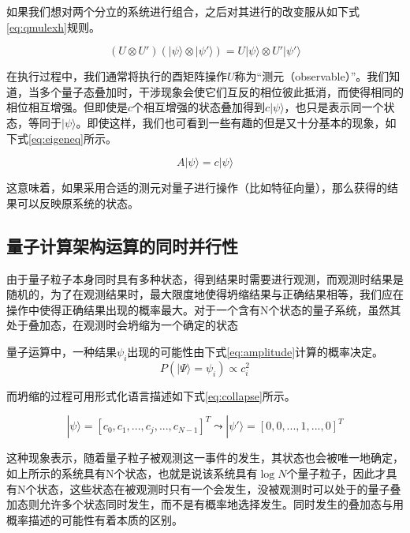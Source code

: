 \documentclass[UTF8, 11pt, a4paper]{ctexart}
\begin{document}
如果我们想对两个分立的系统进行组合，之后对其进行的改变服从如下式\ref{eq:qmulexh}规则。

\begin{equation}
\label{eq:qmulexh}
(U \otimes U')(| \psi \rangle \otimes | \psi ' \rangle ) = U | \psi \rangle \otimes U' | \psi ' \rangle 
\end{equation}

在执行过程中，我们通常将执行的酉矩阵操作$U$称为“测元（observable）”。我们知道，当多个量子态叠加时，干涉现象会使它们互反的相位彼此抵消，而使得相同的相位相互增强。但即使是$c$个相互增强的状态叠加得到$c|\psi \rangle$，也只是表示同一个状态，等同于$|\psi \rangle$。即使这样，我们也可看到一些有趣的但是又十分基本的现象，如下式\ref{eq:eigeneq}所示。

\begin{equation}
\label{eq:eigeneq}
A | \psi \rangle = c | \psi \rangle 
\end{equation}

这意味着，如果采用合适的测元对量子进行操作（比如特征向量），那么获得的结果可以反映原系统的状态。

\subsection{量子计算架构运算的同时并行性}

由于量子粒子本身同时具有多种状态，得到结果时需要进行观测，而观测时结果是随机的，为了在观测结果时，最大限度地使得坍缩结果与正确结果相等，我们应在操作中使得正确结果出现的概率最大。对于一个含有N个状态的量子系统，虽然其处于叠加态，在观测时会坍缩为一个确定的状态

量子运算中，一种结果$\psi_i$出现的可能性由下式\ref{eq:amplitude}计算的概率决定。
\begin{equation}
\label{eq:amplitude}
P(|\Psi\rangle=\psi_i) \propto c_{i}^{2}
\end{equation}

而坍缩的过程可用形式化语言描述如下式\ref{eq:collapse}所示。

\begin{equation}
\label{eq:collapse}
| \psi \rangle = [c_0,c_1,...,c_j,...,c_{N-1}]^T \leadsto | \psi ' \rangle = [0,0,...,1,...,0]^{T}
\end{equation}

这种现象表示，随着量子粒子被观测这一事件的发生，其状态也会被唯一地确定，如上所示的系统具有N个状态，也就是说该系统具有$\log{N}$个量子粒子，因此才具有N个状态，这些状态在被观测时只有一个会发生，没被观测时可以处于的量子叠加态则允许多个状态同时发生，而不是有概率地选择发生。同时发生的叠加态与用概率描述的可能性有着本质的区别。
\end{document}
